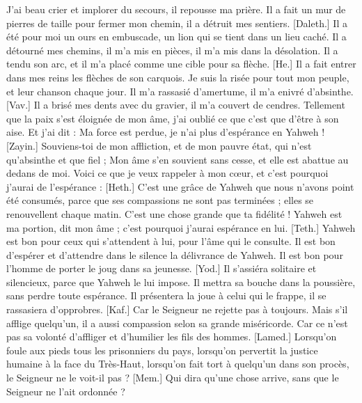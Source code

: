 \begin{multicols}{2}
J'ai beau crier et implorer du secours, il repousse ma prière.
Il a fait un mur de pierres de taille pour fermer mon chemin, il a détruit mes sentiers.
[Daleth.] Il a été pour moi un ours en embuscade, un lion qui se tient dans un lieu caché.
Il a détourné mes chemins, il m’a mis en pièces, il m’a mis dans la désolation.
Il a tendu son arc, et il m’a placé comme une cible pour sa flèche.
[He.] Il a fait entrer dans mes reins les flèches de son carquois.
Je suis la risée pour tout mon peuple, et leur chanson chaque jour.
Il m’a rassasié d’amertume, il m’a enivré d’absinthe.
[Vav.] Il a brisé mes dents avec du gravier, il m’a couvert de cendres.
Tellement que la paix s’est éloignée de mon âme, j’ai oublié ce que c’est que d’être à son aise.
Et j’ai dit : Ma force est perdue, je n'ai plus d'espérance en Yahweh !
[Zayin.] Souviens-toi de mon affliction, et de mon pauvre état, qui n’est qu’absinthe et que fiel ;
Mon âme s’en souvient sans cesse, et elle est abattue au dedans de moi.
Voici ce que je veux rappeler à mon cœur, et c’est pourquoi j’aurai de l'espérance :
[Heth.] C’est une grâce de Yahweh que nous n’avons point été consumés, parce que ses compassions ne sont pas terminées ;
elles se renouvellent chaque matin. C’est une chose grande que ta fidélité !
Yahweh est ma portion, dit mon âme ; c’est pourquoi j’aurai espérance en lui.
[Teth.] Yahweh est bon pour ceux qui s’attendent à lui, pour l’âme qui le consulte.
Il est bon d'espérer et d'attendre dans le silence la délivrance de Yahweh.
Il est bon pour l’homme de porter le joug dans sa jeunesse.
[Yod.] Il s'assiéra solitaire et silencieux, parce que Yahweh le lui impose.
Il mettra sa bouche dans la poussière, sans perdre toute espérance.
Il présentera la joue à celui qui le frappe, il se rassasiera d’opprobres.
[Kaf.] Car le Seigneur ne rejette pas à toujours.
Mais s’il afflige quelqu’un, il a aussi compassion selon sa grande miséricorde.
Car ce n’est pas sa volonté d'affliger et d'humilier les fils des hommes.
[Lamed.] Lorsqu’on foule aux pieds tous les prisonniers du pays,
lorsqu’on pervertit la justice humaine à la face du Très-Haut,
lorsqu’on fait tort à quelqu’un dans son procès, le Seigneur ne le voit-il pas ?
[Mem.] Qui dira qu'une chose arrive, sans que le Seigneur ne l’ait ordonnée ?

\end{multicols}
